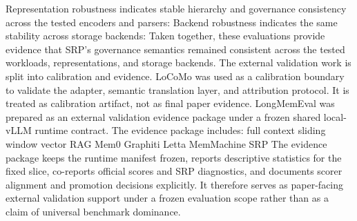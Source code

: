 {}Representation robustness indicates stable hierarchy and governance consistency across the tested encoders and parsers:\markdownRendererInterblockSeparator
{}\markdownRendererInterblockSeparator
{}Backend robustness indicates the same stability across storage backends:\markdownRendererInterblockSeparator
{}\markdownRendererInterblockSeparator
{}Taken together, these evaluations provide evidence that SRP's governance semantics remained consistent across the tested workloads, representations, and storage backends.\markdownRendererInterblockSeparator
{}
\markdownRendererSectionEnd \markdownRendererSectionBegin
{}\markdownRendererInterblockSeparator
{}The external validation work is split into calibration and evidence.\markdownRendererParagraphSeparator
{}LoCoMo was used as a calibration boundary to validate the adapter, semantic translation layer, and attribution protocol. It is treated as calibration artifact, not as final paper evidence.\markdownRendererParagraphSeparator
{}LongMemEval was prepared as an external validation evidence package under a frozen shared local-vLLM runtime contract. The evidence package includes:\markdownRendererInterblockSeparator
{}\markdownRendererUlBeginTight
\markdownRendererUlItem full context\markdownRendererUlItemEnd 
\markdownRendererUlItem sliding window\markdownRendererUlItemEnd 
\markdownRendererUlItem vector RAG\markdownRendererUlItemEnd 
\markdownRendererUlItem Mem0\markdownRendererUlItemEnd 
\markdownRendererUlItem Graphiti\markdownRendererUlItemEnd 
\markdownRendererUlItem Letta\markdownRendererUlItemEnd 
\markdownRendererUlItem MemMachine\markdownRendererUlItemEnd 
\markdownRendererUlItem SRP\markdownRendererUlItemEnd 
\markdownRendererUlEndTight \markdownRendererInterblockSeparator
{}The evidence package keeps the runtime manifest frozen, reports descriptive statistics for the fixed slice, co-reports official scores and SRP diagnostics, and documents scorer alignment and promotion decisions explicitly. It therefore serves as paper-facing external validation support under a frozen evaluation scope rather than as a claim of universal benchmark dominance.\markdownRendererInterblockSeparator
